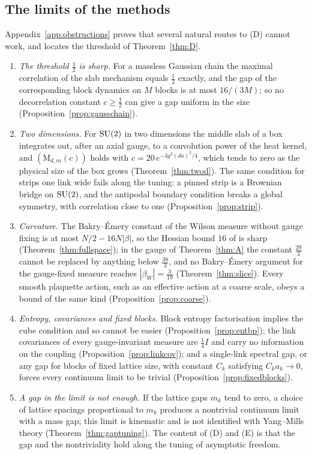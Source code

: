 \subsection{The limits of the methods}

Appendix~\ref{app:obstructions} proves that several natural routes to (D)
cannot work, and locates the threshold of Theorem~\ref{thm:D}.
\begin{enumerate}[label=\textup{(\alph*)},leftmargin=*]
\item \emph{The threshold $\frac12$ is sharp.} For a massless Gaussian chain
the maximal correlation of the slab mechanism equals $\frac12$ exactly, and
the gap of the corresponding block dynamics on $M$ blocks is at most
$16/(3M)$; so no decorrelation constant $c\ge\frac12$ can give a gap uniform in
the size (Proposition~\ref{prop:gausschain}).
\item \emph{Two dimensions.} For $\mathrm{SU}(2)$ in two dimensions the middle slab of
a box integrates out, after an axial gauge, to a convolution power of the
heat kernel, and $(\mathrm M_{d,m}(c))$ holds with
$c=20\,e^{-3g^2(da)^2/4}$, which tends to zero as the physical size of the box
grows (Theorem~\ref{thm:twod}). The same condition for strips one link wide
fails along the tuning: a pinned strip is a Brownian bridge on $\mathrm{SU}(2)$, and
the antipodal boundary condition breaks a global symmetry, with correlation
close to one (Proposition~\ref{prop:strip}).
\item \emph{Curvature.} The Bakry--\'Emery constant of the Wilson measure
without gauge fixing is at most $N/2-16N|\beta|$, so the Hessian bound $16$ of
\cite{BB26a} is sharp (Theorem~\ref{thm:fullspace}); in the gauge of
Theorem~\ref{thm:A} the constant $\frac{29}2$ cannot be replaced by anything
below $\frac{38}3$, and no Bakry--\'Emery argument for the gauge-fixed measure
reaches $|\beta_W|=\frac3{19}$ (Theorem~\ref{thm:slice}). Every smooth
plaquette action, such as an effective action at a coarse scale, obeys a bound
of the same kind (Proposition~\ref{prop:coarse}).
\item \emph{Entropy, covariances and fixed blocks.} Block entropy
factorisation implies the cube condition and so cannot be easier
(Proposition~\ref{prop:entbp}); the link covariances of every gauge-invariant
measure are $\frac14I$ and carry no information on the coupling
(Proposition~\ref{prop:linkcov}); and a single-link spectral gap, or any gap
for blocks of fixed lattice size, with constant $C_k$ satisfying $C_ka_k\to0$,
forces every continuum limit to be trivial
(Proposition~\ref{prop:fixedblocks}).
\item \emph{A gap in the limit is not enough.} If the lattice gaps $m_k$ tend
to zero, a choice of lattice spacings proportional to $m_k$ produces a
nontrivial continuum limit with a mass gap; this limit is kinematic and is not
identified with Yang--Mills theory (Theorem~\ref{thm:gaptuning}). The content
of (D) and (E) is that the gap and the nontriviality hold along the tuning of
asymptotic freedom.
\end{enumerate}

